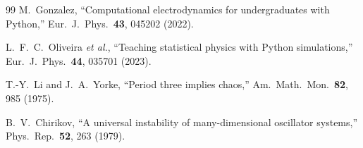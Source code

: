 \documentclass[aps,twocolumn,showpacs]{revtex4-2}
\begin{document}
\begin{thebibliography}{99}
M.~Gonzalez,
``Computational electrodynamics for undergraduates with Python,''
Eur.\ J.\ Phys.\ \textbf{43}, 045202 (2022).

L.~F.~C.~Oliveira \emph{et al.},
``Teaching statistical physics with Python simulations,''
Eur.\ J.\ Phys.\ \textbf{44}, 035701 (2023).

T.-Y.~Li and J.~A.~Yorke,
``Period three implies chaos,''
Am.\ Math.\ Mon.\ \textbf{82}, 985 (1975).

B.~V.~Chirikov,
``A universal instability of many-dimensional oscillator systems,''
Phys.\ Rep.\ \textbf{52}, 263 (1979).

\end{thebibliography}
\end{document}
